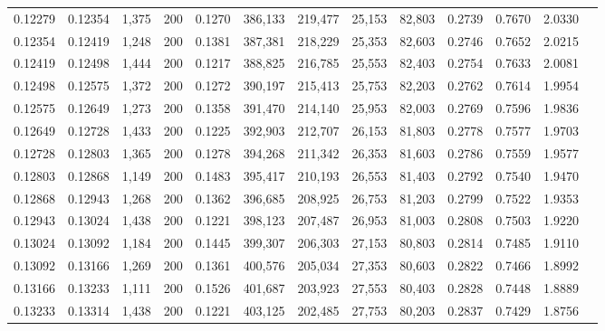 \begin{tabular}{rrrrrrrrrrrrr}
0.12279 & 0.12354 &  1,375 & 200 &                                     0.1270 & 386,133 & 219,477 &  25,153 &  82,803 & 0.2739 & 0.7670 & 2.0330 \\
0.12354 & 0.12419 &  1,248 & 200 &                                     0.1381 & 387,381 & 218,229 &  25,353 &  82,603 & 0.2746 & 0.7652 & 2.0215 \\
0.12419 & 0.12498 &  1,444 & 200 &                                     0.1217 & 388,825 & 216,785 &  25,553 &  82,403 & 0.2754 & 0.7633 & 2.0081 \\
0.12498 & 0.12575 &  1,372 & 200 &                                     0.1272 & 390,197 & 215,413 &  25,753 &  82,203 & 0.2762 & 0.7614 & 1.9954 \\
0.12575 & 0.12649 &  1,273 & 200 &                                     0.1358 & 391,470 & 214,140 &  25,953 &  82,003 & 0.2769 & 0.7596 & 1.9836 \\
0.12649 & 0.12728 &  1,433 & 200 &                                     0.1225 & 392,903 & 212,707 &  26,153 &  81,803 & 0.2778 & 0.7577 & 1.9703 \\
0.12728 & 0.12803 &  1,365 & 200 &                                     0.1278 & 394,268 & 211,342 &  26,353 &  81,603 & 0.2786 & 0.7559 & 1.9577 \\
0.12803 & 0.12868 &  1,149 & 200 &                                     0.1483 & 395,417 & 210,193 &  26,553 &  81,403 & 0.2792 & 0.7540 & 1.9470 \\
0.12868 & 0.12943 &  1,268 & 200 &                                     0.1362 & 396,685 & 208,925 &  26,753 &  81,203 & 0.2799 & 0.7522 & 1.9353 \\
0.12943 & 0.13024 &  1,438 & 200 &                                     0.1221 & 398,123 & 207,487 &  26,953 &  81,003 & 0.2808 & 0.7503 & 1.9220 \\
0.13024 & 0.13092 &  1,184 & 200 &                                     0.1445 & 399,307 & 206,303 &  27,153 &  80,803 & 0.2814 & 0.7485 & 1.9110 \\
0.13092 & 0.13166 &  1,269 & 200 &                                     0.1361 & 400,576 & 205,034 &  27,353 &  80,603 & 0.2822 & 0.7466 & 1.8992 \\
0.13166 & 0.13233 &  1,111 & 200 &                                     0.1526 & 401,687 & 203,923 &  27,553 &  80,403 & 0.2828 & 0.7448 & 1.8889 \\
0.13233 & 0.13314 &  1,438 & 200 &                                     0.1221 & 403,125 & 202,485 &  27,753 &  80,203 & 0.2837 & 0.7429 & 1.8756 \\

\end{tabular}
